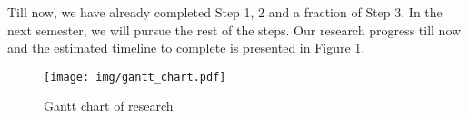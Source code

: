 \documentclass{standalone}
\begin{document}
Till now, we have already completed Step 1, 2 and a fraction of Step 3. In the next semester, we will pursue the rest of the steps. Our research progress till now and the estimated timeline to complete is presented in Figure \ref{fig:gantt}. 
\begin{figure}[h]
\texttt{[image: img/gantt\_chart.pdf]}

\caption{Gantt chart of research}
\label{fig:gantt}
\end{figure}
\end{document}
